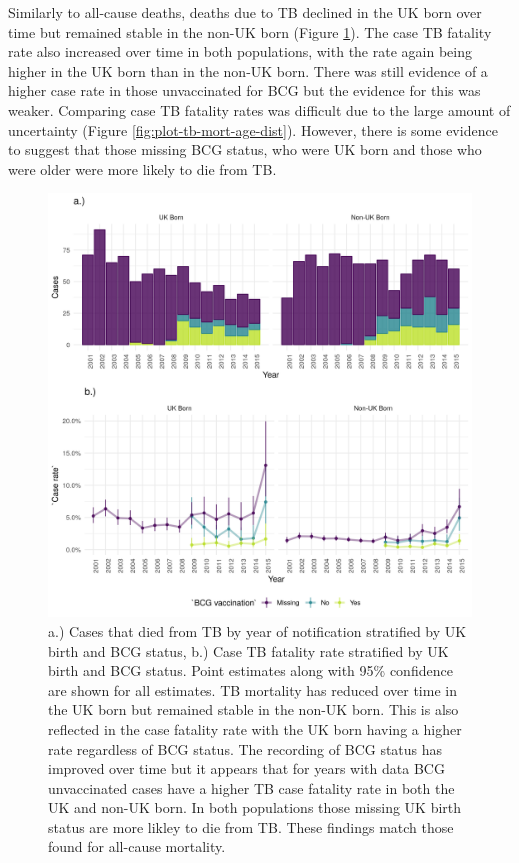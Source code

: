 \documentclass[11pt,twoside]{bristolthesis}
\begin{document}
  Similarly to all-cause deaths, deaths due to TB declined in the UK born over time but remained stable in the non-UK born (Figure \ref{fig:plot-tb-mort-case-rate}). The case TB fatality rate also increased over time in both populations, with the rate again being higher in the UK born than in the non-UK born. There was still evidence of a higher case rate in those unvaccinated for BCG but the evidence for this was weaker. Comparing case TB fatality rates was difficult due to the large amount of uncertainty (Figure \ref{fig:plot-tb-mort-age-dist}). However, there is some evidence to suggest that those missing BCG status, who were UK born and those who were older were more likely to die from TB.
  \begin{figure}
  
  {\centering \includegraphics[width=0.8\linewidth]{chapters/tb-epi-england/figures/plot-tb-mort-case-rate} 
  
  }
  
  \caption{a.) Cases that died from TB by year of notification stratified by UK birth and BCG status, b.) Case TB fatality rate stratified by UK birth and BCG status. Point estimates along with 95\% confidence are shown for all estimates. TB mortality has reduced over time in the UK born but remained stable in the non-UK born. This is also reflected in the case fatality rate with the UK born having a higher rate regardless of BCG status. The recording of BCG status has improved over time but it appears that for years with data BCG unvaccinated cases have a higher TB case fatality rate in both the UK and non-UK born. In both populations those missing UK birth status are more likley to die from TB. These findings match those found for all-cause mortality.}\label{fig:plot-tb-mort-case-rate}
  \end{figure}
\end{document}

